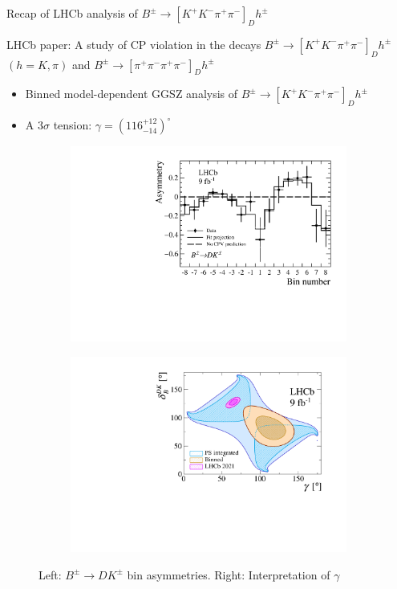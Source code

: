 \documentclass{beamer}
\begin{document}
\begin{frame}{Recap of LHCb analysis of $B^\pm\to[K^+K^-\pi^+\pi^-]_Dh^\pm$}
  \begin{center}
    LHCb paper: A study of CP violation in the decays $B^\pm\to[K^+K^-\pi^+\pi^-]_Dh^\pm$ $(h = K, \pi)$ and $B^\pm\to[\pi^+\pi^-\pi^+\pi^-]_Dh^\pm$
  \end{center}
  \vspace{0.1cm}
  \begin{itemize}
    \item{Binned model-dependent GGSZ analysis of $B^\pm\to[K^+K^-\pi^+\pi^-]_Dh^\pm$}
    \item{A $3\sigma$ tension: $\gamma = (116^{+12}_{-14})^\circ$}
  \end{itemize}
  \begin{figure}
    \centering
    \begin{subfigure}{0.4\textwidth}
      \includegraphics[width = 1.0\textwidth]{Plots/BinAsymmetries_dk.pdf}
    \end{subfigure}%
    \hspace{1cm}
    \begin{subfigure}{0.4\textwidth}
      \includegraphics[width = 1.0\textwidth]{Plots/gammacharm_lhcb_KKpipi_GLW_KKpipi_GGSZ_lhcb_2020_beauty_and_charm_g_d_dk.pdf}
    \end{subfigure}
    \caption{Left: $B^\pm\to DK^\pm$ bin asymmetries. Right: Interpretation of $\gamma$}
  \end{figure}
\end{frame}
\end{document}
